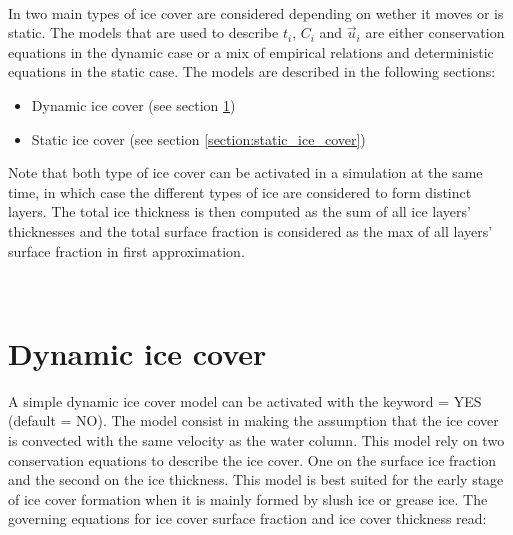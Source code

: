 \

In \khione two main types of ice cover are considered depending on wether it moves or is static.
The models that are used to describe $t_i$, $C_i$ and $\vec{u}_i$ are either conservation equations
in the dynamic case or a mix of empirical relations and deterministic equations in the static case.
The models are described in the following sections:
\begin{itemize}
\item Dynamic ice cover (see section \ref{section:dynamics_ice_cover})
\item Static ice cover (see section \ref{section:static_ice_cover})
\end{itemize}
Note that both type of ice cover can be activated in a simulation at the same time,
in which case the different types of ice are considered to form distinct layers.
The total ice thickness is then computed as the sum of all ice layers' thicknesses
and the total surface fraction is considered as the max of all layers' surface fraction
in first approximation.



~\newline
\section{Dynamic ice cover}
\label{section:dynamics_ice_cover}


A simple dynamic ice cover model can be activated with the keyword
  = YES (default = NO).
The model consist in making the assumption that the ice cover is convected
with the same velocity as the water column. 
This model rely on two conservation equations to describe the ice cover.
One on the surface ice fraction and the second on the ice thickness.
This model is best suited for the early stage of ice cover formation when it is mainly formed by slush ice or grease ice.
The governing equations for ice cover surface fraction and ice cover thickness read:

